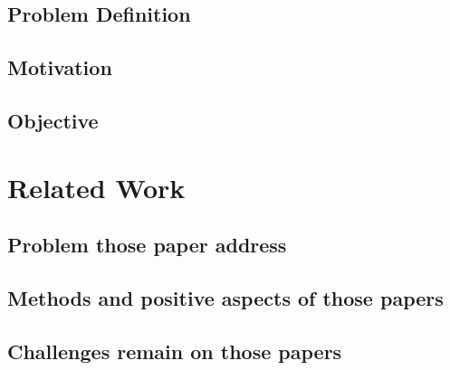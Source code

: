 \documentclass{article}
\begin{document}
\subsection{Problem Definition}

\subsection{Motivation}
\subsection{Objective}
\section{Related Work}
\subsection{Problem those paper address}
\subsection{Methods and positive aspects of those papers}
\subsection{Challenges remain on those papers}
\end{document}
